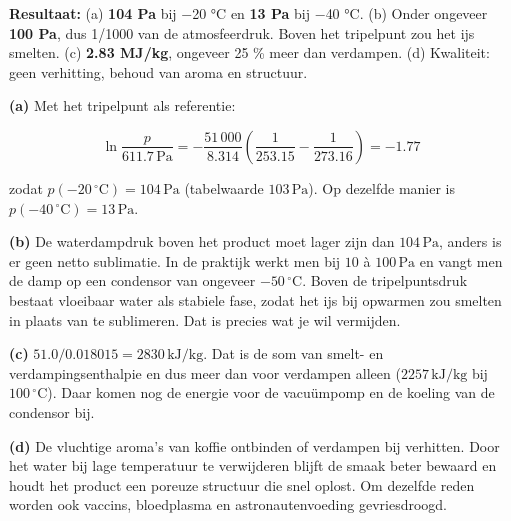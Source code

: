 \begin{oplossing}
\textbf{Resultaat:} (a) \textbf{104 Pa} bij \ensuremath{-}20 °C en \textbf{13 Pa} bij \ensuremath{-}40 °C. (b) Onder ongeveer \textbf{100 Pa}, dus 1/1000 van de atmosfeerdruk. Boven het tripelpunt zou het ijs smelten. (c) \textbf{2.83 MJ/kg}, ongeveer 25 \% meer dan verdampen. (d) Kwaliteit: geen verhitting, behoud van aroma en structuur.

\textbf{(a)} Met het tripelpunt als referentie:

\[
\ln\frac{p}{611.7\,\mathrm{Pa}} = -\frac{51\,000}{8.314}\left(\frac{1}{253.15}-\frac{1}{273.16}\right) = -1.77
\]

zodat \(p(-20\,^\circ\mathrm{C}) = 104\,\mathrm{Pa}\) (tabelwaarde \(103\,\mathrm{Pa}\)). Op dezelfde manier is \(p(-40\,^\circ\mathrm{C}) = 13\,\mathrm{Pa}\).

\textbf{(b)} De waterdampdruk boven het product moet lager zijn dan \(104\,\mathrm{Pa}\), anders is er geen netto sublimatie. In de praktijk werkt men bij \(10\) à \(100\,\mathrm{Pa}\) en vangt men de damp op een condensor van ongeveer \(-50\,^\circ\mathrm{C}\). Boven de tripelpuntsdruk bestaat vloeibaar water als stabiele fase, zodat het ijs bij opwarmen zou smelten in plaats van te sublimeren. Dat is precies wat je wil vermijden.

\textbf{(c)} \(51.0/0.018015 = 2830\,\mathrm{kJ/kg}\). Dat is de som van smelt- en verdampingsenthalpie en dus meer dan voor verdampen alleen (\(2257\,\mathrm{kJ/kg}\) bij \(100\,^\circ\mathrm{C}\)). Daar komen nog de energie voor de vacuümpomp en de koeling van de condensor bij.

\textbf{(d)} De vluchtige aroma's van koffie ontbinden of verdampen bij verhitten. Door het water bij lage temperatuur te verwijderen blijft de smaak beter bewaard en houdt het product een poreuze structuur die snel oplost. Om dezelfde reden worden ook vaccins, bloedplasma en astronautenvoeding gevriesdroogd.
\end{oplossing}

